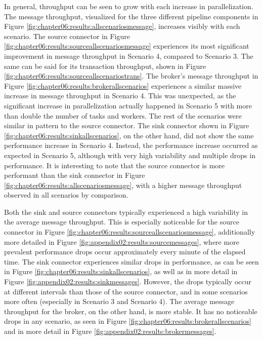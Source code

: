 In general, throughput can be seen to grow with each increase in parallelization. The message throughput, visualized for the three different pipeline components in Figure \ref{fig:chapter06:results:allscenariosmessage}, increases visibly with each scenario. The source connector in Figure \ref{fig:chapter06:results:sourceallscenariosmessage} experiences its most significant improvement in message throughput in Scenario 4, compared to Scenario 3. The same can be said for its transaction throughput, shown in Figure \ref{fig:chapter06:results:sourceallscenariostrans}. The broker's message throughput in Figure \ref{fig:chapter06:results:brokerallscenarios} experiences a similar massive increase in message throughput in Scenario 4. This was unexpected, as the significant increase in parallelization actually happened in Scenario 5 with more than double the number of tasks and workers. The rest of the scenarios were similar in pattern to the source connector. The sink connector shown in Figure \ref{fig:chapter06:results:sinkallscenarios}, on the other hand, did not show the same performance increase in Scenario 4. Instead, the performance increase occurred as expected in Scenario 5, although with very high variability and multiple drops in performance. It is interesting to note that the source connector is more performant than the sink connector in Figure \ref{fig:chapter06:results:allscenariosmessage}, with a higher message throughput observed in all scenarios by comparison.

Both the sink and source connectors typically experienced a high variability in the average message throughput. This is especially noticeable for the source connector in Figure \ref{fig:chapter06:results:sourceallscenariosmessage}, additionally more detailed in Figure \ref{fig:appendix02:results:sourcemessages}, where more prevalent performance drops occur approximately every minute of the elapsed time. The sink connector experiences similar drops in performance, as can be seen in Figure \ref{fig:chapter06:results:sinkallscenarios}, as well as in more detail in Figure \ref{fig:appendix02:results:sinkmessages}. However, the drops typically occur at different intervals than those of the source connector, and in some scenarios more often (especially in Scenario 3 and Scenario 4). The average message throughput for the broker, on the other hand, is more stable. It has no noticeable drops in any scenario, as seen in Figure \ref{fig:chapter06:results:brokerallscenarios} and in more detail in Figure \ref{fig:appendix02:results:brokermessages}.

